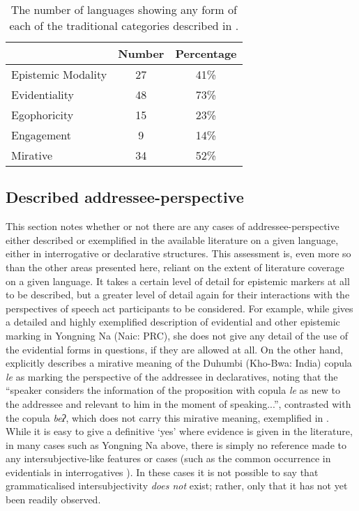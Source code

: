 \begin{table}\caption{The number of languages showing any form of each of the traditional categories described in .}\label{t:Methods:FunctionStats}
  \centering
  \begin{tabular}{lcc}
  \hline
   & Number & Percentage \\ \hline
  Epistemic Modality & 27 & 41\% \\
  Evidentiality & 48 & 73\% \\
  Egophoricity & 15 & 23\% \\
  Engagement & 9 & 14\% \\
  Mirative & 34 & 52\% \\ \hline
  \end{tabular}
  \end{table}

\subsection{Described addressee-perspective}\label{ss:Methods:Addressee}
This section notes whether or not there are any cases of addressee-perspective either described or exemplified in the available literature on a given language, either in interrogative or declarative structures. This assessment is, even more so than the other areas presented here, reliant on the extent of literature coverage on a given language. It takes a certain level of detail for epistemic markers at all to be described, but a greater level of detail again for their interactions with the perspectives of speech act participants to be considered. For example, while  gives a detailed and highly exemplified description of evidential and other epistemic marking in Yongning Na (Naic: PRC), she does not give any detail of the use of the evidential forms in questions, if they are allowed at all. On the other hand,  explicitly describes a mirative meaning of the Duhumbi (Kho-Bwa: India) copula \textit{le} as marking the perspective of the addressee in declaratives, noting that the ``speaker considers the information of the proposition with copula \textit{le} as new to the addressee and relevant to him in the moment of speaking...'', contrasted with the copula \textit{beʔ}, which does not carry this mirative meaning, exemplified in . While it is easy to give a definitive `yes' where evidence is given in the literature, in many cases such as Yongning Na above, there is simply no reference made to any intersubjective-like features or cases (such as the common occurrence in evidentials in interrogatives \cite{Aikhenvald2018Intro}). In these cases it is not possible to say that grammaticalised intersubjectivity \textit{does not} exist; rather, only that it has not yet been readily observed.

